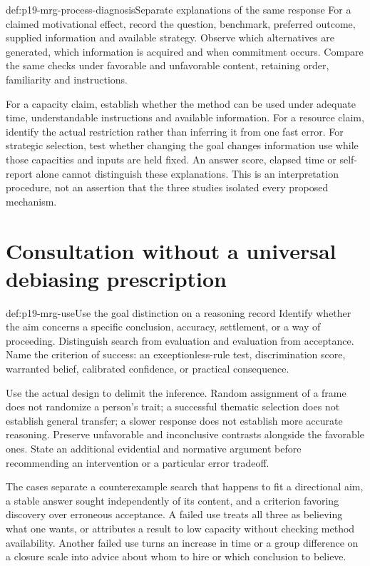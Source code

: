 \begin{hbmethod}{def:p19-mrg-process-diagnosis}{Separate explanations of the same response}
For a claimed motivational effect, record the question, benchmark, preferred
outcome, supplied information and available strategy. Observe which
alternatives are generated, which information is acquired and when
commitment occurs. Compare the same checks under favorable and unfavorable
content, retaining order, familiarity and instructions.

For a capacity claim, establish whether the method can be used under
adequate time, understandable instructions and available information.
For a resource claim, identify the actual restriction rather than inferring
it from one fast error. For strategic selection, test whether changing
the goal changes information use while those capacities and inputs are held
fixed. An answer score, elapsed time or self-report alone cannot distinguish
these explanations. This is an interpretation procedure, not an assertion
that the three studies isolated every proposed mechanism.
\end{hbmethod}

\section{Consultation without a universal debiasing prescription}
\label{sec:p19-mrg-use}

\begin{hbmethod}{def:p19-mrg-use}{Use the goal distinction on a reasoning record}
Identify whether the aim concerns a specific conclusion, accuracy,
settlement, or a way of proceeding. Distinguish search from evaluation
and evaluation from acceptance. Name the criterion of success: an
exceptionless-rule test, discrimination score, warranted belief, calibrated
confidence, or practical consequence.

Use the actual design to delimit the inference. Random assignment of a
frame does not randomize a person's trait; a successful thematic selection
does not establish general transfer; a slower response does not establish
more accurate reasoning. Preserve unfavorable and inconclusive contrasts
alongside the favorable ones. State an additional evidential and normative
argument before recommending an intervention or a particular error tradeoff.
\end{hbmethod}

The cases separate a counterexample search that happens to fit a directional
aim, a stable answer sought independently of its content, and a criterion
favoring discovery over erroneous acceptance. A failed use treats all three
as believing what one wants, or attributes a result to low capacity
without checking method availability. Another failed use turns an increase
in time or a group difference on a closure scale into advice about whom to
hire or which conclusion to believe.

